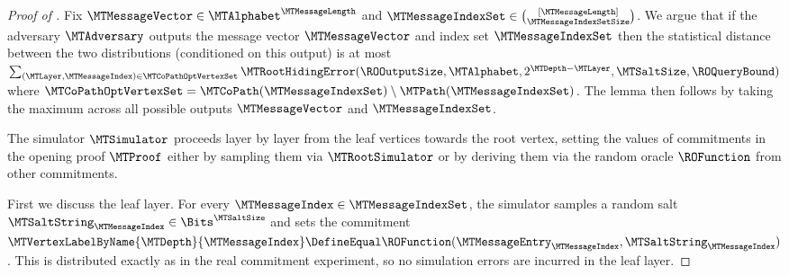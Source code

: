 \begin{proof}[Proof of ]
Fix $\MTMessageVector \in \MTAlphabet^{\MTMessageLength}$ and $\MTMessageIndexSet \in \binom{[\MTMessageLength]}{\MTMessageIndexSetSize}$. We argue that if the adversary $\MTAdversary$ outputs the message vector $\MTMessageVector$ and index set $\MTMessageIndexSet$ then the statistical distance between the two distributions (conditioned on this output) is at most $\sum_{(\MTLayer,\MTMessageIndex) \in \MTCoPathOptVertexSet} \MTRootHidingError(\ROOutputSize,\MTAlphabet,2^{\MTDepth-\MTLayer},\MTSaltSize,\ROQueryBound)$ where $\MTCoPathOptVertexSet = \MTCoPath(\MTMessageIndexSet) \setminus \MTPath(\MTMessageIndexSet)$. The lemma then follows by taking the maximum across all possible outputs $\MTMessageVector$ and $\MTMessageIndexSet$.

The simulator $\MTSimulator$ proceeds layer by layer from the leaf vertices towards the root vertex, setting the values of commitments in the opening proof $\MTProof$ either by sampling them via $\MTRootSimulator$ or by deriving them via the random oracle $\ROFunction$ from other commitments.

First we discuss the leaf layer. For every $\MTMessageIndex \in \MTMessageIndexSet$, the simulator samples a random salt $\MTSaltString_{\MTMessageIndex} \in \Bits^{\MTSaltSize}$ and sets the commitment $\MTVertexLabelByName{\MTDepth}{\MTMessageIndex} \DefineEqual \ROFunction(\MTMessageEntry_{\MTMessageIndex},\MTSaltString_{\MTMessageIndex})$. This is distributed exactly as in the real commitment experiment, so no simulation errors are incurred in the leaf layer.


\end{proof}
